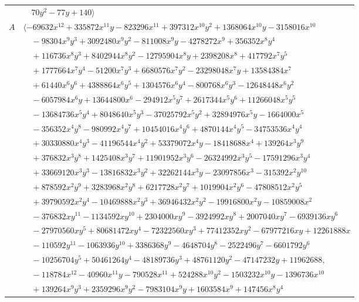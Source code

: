 \documentclass[11pt]{article}
\begin{document}
\begin{longtable}{@{}ll@{}}
 & $\quad 70y^{2}-77y+140\rangle$\\
$A$ & $\langle -69632x^{12}+335872x^{11}y-823296x^{11}+397312x^{10}y^{2}+1368064x^{10}y-3158016x^{10}$\\
 & $\quad -98304x^{9}y^{3}+3092480x^{9}y^{2}-811008x^{9}y-4278272x^{9}+356352x^{8}y^{4}$\\
 & $\quad +116736x^{8}y^{3}+8402944x^{8}y^{2}-12795904x^{8}y+2398208x^{8}+417792x^{7}y^{5}$\\
 & $\quad +1777664x^{7}y^{4}-51200x^{7}y^{3}+6680576x^{7}y^{2}-23298048x^{7}y+13584384x^{7}$\\
 & $\quad +61440x^{6}y^{6}+4388864x^{6}y^{5}+1304576x^{6}y^{4}-800768x^{6}y^{3}-12648448x^{6}y^{2}$\\
 & $\quad -6057984x^{6}y+13644800x^{6}-294912x^{5}y^{7}+2617344x^{5}y^{6}+11266048x^{5}y^{5}$\\
 & $\quad -13684736x^{5}y^{4}+8048640x^{5}y^{3}-37025792x^{5}y^{2}+32894976x^{5}y-1664000x^{5}$\\
 & $\quad -356352x^{4}y^{8}-980992x^{4}y^{7}+10454016x^{4}y^{6}+4870144x^{4}y^{5}-34753536x^{4}y^{4}$\\
 & $\quad +30330880x^{4}y^{3}-41196544x^{4}y^{2}+53379072x^{4}y-18418688x^{4}+139264x^{3}y^{9}$\\
 & $\quad +376832x^{3}y^{8}+1425408x^{3}y^{7}+11901952x^{3}y^{6}-26324992x^{3}y^{5}-17591296x^{3}y^{4}$\\
 & $\quad +33669120x^{3}y^{3}-13816832x^{3}y^{2}+32262144x^{3}y-23097856x^{3}-315392x^{2}y^{10}$\\
 & $\quad +878592x^{2}y^{9}+3283968x^{2}y^{8}+6217728x^{2}y^{7}+1019904x^{2}y^{6}-47808512x^{2}y^{5}$\\
 & $\quad +39790592x^{2}y^{4}-10469888x^{2}y^{3}+36946432x^{2}y^{2}-19916800x^{2}y-10859008x^{2}$\\
 & $\quad -376832xy^{11}-1134592xy^{10}+2304000xy^{9}-3924992xy^{8}+2007040xy^{7}-6939136xy^{6}$\\
 & $\quad -27970560xy^{5}+80681472xy^{4}-72322560xy^{3}+77412352xy^{2}-67977216xy+12261888x$\\
 & $\quad -110592y^{11}-1063936y^{10}+3386368y^{9}-4648704y^{8}-2522496y^{7}-6601792y^{6}$\\
 & $\quad -10256704y^{5}+50461264y^{4}-48189736y^{3}+48761120y^{2}-47147232y+11962688,$\\
 & $\quad -118784x^{12}-40960x^{11}y-790528x^{11}+524288x^{10}y^{2}-1503232x^{10}y-1396736x^{10}$\\
 & $\quad +139264x^{9}y^{3}+2359296x^{9}y^{2}-7983104x^{9}y+1603584x^{9}+147456x^{8}y^{4}$\\

\end{longtable}
\end{document}
